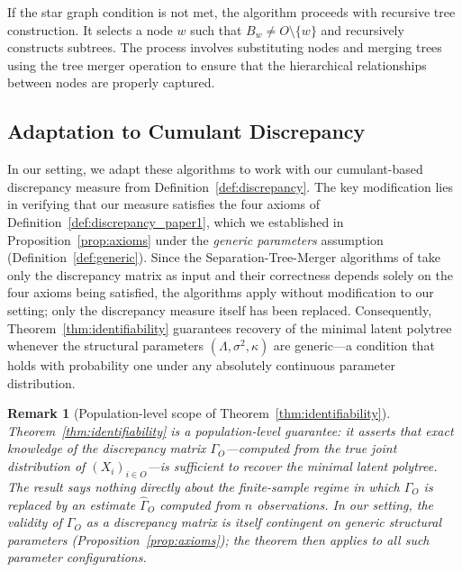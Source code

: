 \documentclass[11pt,a4paper]{article}
\numberwithin{equation}{section}
\newtheorem{remark}[theorem]{Remark}
\begin{document}
If the star graph condition is not met, the algorithm proceeds with recursive tree construction. It selects a node $w$ such that $B_w \neq O \setminus \{w\}$ and recursively constructs subtrees. The process involves substituting nodes and merging trees using the tree merger operation to ensure that the hierarchical relationships between nodes are properly captured.

\subsection{Adaptation to Cumulant Discrepancy}

In our setting, we adapt these algorithms to work with our cumulant-based
discrepancy measure from Definition~\ref{def:discrepancy}. The key
modification lies in verifying that our measure satisfies the four axioms of
Definition~\ref{def:discrepancy_paper1}, which we established in
Proposition~\ref{prop:axioms} under the \emph{generic parameters} assumption
(Definition~\ref{def:generic}). Since the Separation-Tree-Merger algorithms of
\citet{etesami:kiyavash:coleman:2016} take only the discrepancy matrix as input
and their correctness depends solely on the four axioms being satisfied, the
algorithms apply without modification to our setting; only the discrepancy
measure itself has been replaced.  Consequently, Theorem~\ref{thm:identifiability}
guarantees recovery of the minimal latent polytree whenever the structural
parameters $(\Lambda,\sigma^{2},\kappa)$ are generic---a condition that holds
with probability one under any absolutely continuous parameter distribution.

\begin{remark}[Population-level scope of Theorem~\ref{thm:identifiability}]
\label{rem:population_scope}
Theorem~\ref{thm:identifiability} is a \emph{population-level} guarantee: it
asserts that exact knowledge of the discrepancy matrix $\Gamma_O$---computed
from the true joint distribution of $(X_i)_{i\in O}$---is sufficient to recover
the minimal latent polytree.  The result says nothing directly about the
finite-sample regime in which $\Gamma_O$ is replaced by an estimate
$\hat\Gamma_O$ computed from $n$ observations.  In our setting, the validity of
$\Gamma_O$ as a discrepancy matrix is itself contingent on generic structural
parameters (Proposition~\ref{prop:axioms}); the theorem then applies to all
such parameter configurations.
\end{remark}
\end{document}

